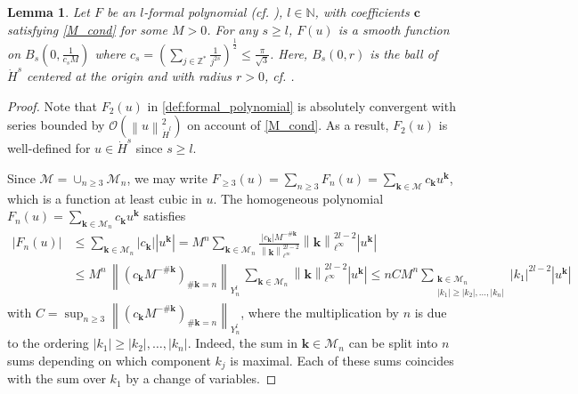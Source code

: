 \documentclass[a4paper,10pt,reqno]{article}
\theoremstyle{definition}
\theoremstyle{plain}
\theoremstyle{plain}
\theoremstyle{definition}
\theoremstyle{plain}
\theoremstyle{plain}
\theoremstyle{plain}
\newtheorem{lemma}[definition]{Lemma}
\theoremstyle{definition}
\theoremstyle{definition}
\newcommand{\norm}[1]{\left\lVert #1 \right\rVert}
\def \N{\mathbb N}
\def \Z{\mathbb Z}
\def \O{\mathcal{O}}
\def \M{\mathcal{M}}
\def \k{\bm{k}}
\begin{document}
\begin{lemma} \label{lemma: convergence of hamiltonian function}
Let $F$ be an $l$-formal polynomial (cf. ), $l\in\N$, with coefficients $\bm{c}$ satisfying \eqref{M_cond} for some $M>0$. For any $s \ge l$, $F(u)$ is a smooth function on $B_s \left ( 0, \frac{1}{c_s M} \right )$ where $c_s = \left ( \sum_{j \in \Z^*} \frac{1}{j^{2s}} \right )^{\frac{1}{2}} \le \frac{\pi}{\sqrt{3}}$.
Here, $B_s(0,r)$ is the ball of $\dot{H}^s$ centered at the origin and with radius $r > 0$, cf. .
\end{lemma}
\begin{proof}
Note that $F_2(u)$ in \eqref{def:formal_polynomial} is absolutely convergent with series bounded by $\O(\norm{u}_{\dot{H}^l}^2)$ on account of \eqref{M_cond}. As a result, $F_2(u)$ is well-defined for $u\in\dot{H}^s$ since $s\geq l$.

Since $\M = \cup_{n \ge 3} \M_n$, we may write $F_{\geq 3} (u) = \sum_{n \ge 3} F_n(u) = \sum_{\k \in \M} c_{\k} u^{\k}$, which is a function at least cubic in $u$.
The homogeneous polynomial $F_n(u) = \sum_{\k \in \M_n} c_{\k} u^{\k}$ satisfies
\begin{align}
|F_n(u)| & \le \sum_{\k \in \M_n} |c_{\k}| |u^{\k}| = M^n \sum_{\k \in \M_n} \frac{|c_{\k}|M^{-\#\k}}{\norm{\k}_{\ell^{\infty}}^{2l-2}} \norm{\k}_{\ell^{\infty}}^{2l-2} |u^{\k}| \label{key_bound_Y} \\
&\le  M^n\, \norm{ (c_{\k} M^{-\#{\k}})_{\#{\k} = n} }_{Y_n^l}  \,\sum_{\k \in \M_n} \norm{\k}_{\ell^{\infty}}^{2l-2} |u^{\k}|  \le n C M^n \sum_{ \substack{ \k \in \M_n \\ |k_1| \ge |k_2|,\ldots,|k_n|} } |k_1|^{2l-2} |u^{\k}| \nonumber
\end{align}
with $C= \sup_{n \ge 3} \norm{ (c_{\k} M^{-\#{\k}})_{\#{\k} = n} }_{Y_n^l}$, where the multiplication by $n$ is due to the ordering $|k_1|\geq |k_2|,\ldots, |k_n|$. 
Indeed, the sum in $\k\in\M_n$ can be split into $n$ sums depending on which component $k_j$ is maximal. Each of these sums coincides with the sum over $k_1$ by a change of variables.


\end{proof}
\end{document}
